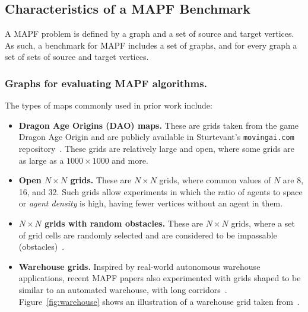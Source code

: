 \documentclass[letterpaper]{article} %
\newcommand{\mapf}{\ac{MAPF}\xspace}
\newcommand{\comment}[1]{{\nb{\textbf{Comment:}}{orange}{#1}}}
\begin{document}
\subsection{Characteristics of a \mapf Benchmark}
A \mapf problem is defined by a graph and a set of source and target vertices. As such, a benchmark for \mapf includes a set of graphs, and for every graph a set of sets of source and target vertices.
\subsubsection{Graphs for evaluating \mapf algorithms.}
The types of maps commonly used in prior work include:
\begin{itemize}
    \item \textbf{Dragon Age Origins (DAO) maps.} These are grids taken from the game Dragon Age Origin and are publicly available in Sturtevant's \texttt{movingai.com}  repository~\cite{sturtevant2012benchmarks}.
    These grids are relatively large and open, where some grids are as large as a $1000\times 1000$ and more.

    \item \textbf{Open $N\times N$ grids.} These are $N\times N$ grids, where common values of $N$ are 8, 16, and 32. Such grids allow experiments in which the ratio of agents to space or \emph{agent density} is high, having fewer vertices without an agent in them.

    \item \textbf{$N\times N$ grids with random obstacles.} These are  $N\times N$ grids, where a set of grid cells are randomly  selected and are considered to be impassable (obstacles)~\cite{standley2010finding}.

    \item \textbf{Warehouse grids.} Inspired by real-world autonomous warehouse applications, recent \mapf papers also experimented with grids shaped to be similar to an automated warehouse, with long corridors~\cite{MaAAMAS17,cohen2018anytime}. Figure~\ref{fig:warehouse} shows an illustration of a warehouse grid taken from~\cite{cohen2018anytime}.
\end{itemize}
\end{document}
